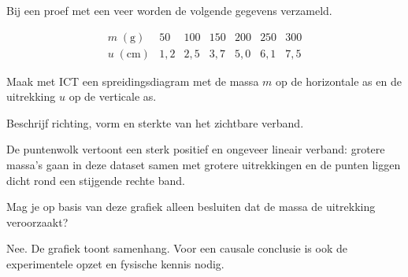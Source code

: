 \documentclass{ximera}
\begin{document}
\begin{oefening}{\oefB \ESS}

Bij een proef met een veer worden de volgende gegevens verzameld.

\[
\begin{array}{c|rrrrrr}
m\;(\mathrm{g})&50&100&150&200&250&300\\ \hline
u\;(\mathrm{cm})&1{,}2&2{,}5&3{,}7&5{,}0&6{,}1&7{,}5
\end{array}
\]

\begin{question}
Maak met ICT een spreidingsdiagram met de massa $m$ op de horizontale
as en de uitrekking $u$ op de verticale as.
\end{question}

\begin{question}
Beschrijf richting, vorm en sterkte van het zichtbare verband.

\begin{oplossing}
De puntenwolk vertoont een sterk positief en ongeveer lineair verband:
grotere massa's gaan in deze dataset samen met grotere uitrekkingen en
de punten liggen dicht rond een stijgende rechte band.
\end{oplossing}
\end{question}

\begin{question}
Mag je op basis van deze grafiek alleen besluiten dat de massa de
uitrekking veroorzaakt?

\begin{oplossing}
Nee. De grafiek toont samenhang. Voor een causale conclusie is ook de
experimentele opzet en fysische kennis nodig.
\end{oplossing}
\end{question}
\end{oefening}
\end{document}
